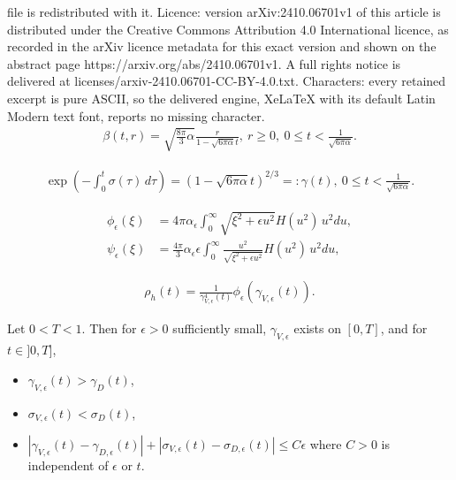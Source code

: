 \documentclass[10pt,a4paper]{amsart}
\begin{document}
file is redistributed with it. Licence: version arXiv:2410.06701v1 of this article is distributed under the Creative Commons Attribution 4.0 International licence, as recorded in the arXiv licence metadata for this exact version and shown on the abstract page https://arxiv.org/abs/2410.06701v1. A full rights notice is delivered at licenses/arxiv-2410.06701-CC-BY-4.0.txt. Characters: every retained excerpt is pure ASCII, so the delivered engine, XeLaTeX with its default Latin Modern text font, reports no missing character.
\begin{align}\label{beta_dust}
  \beta(t,r) = \sqrt{\frac{8\pi}{3} \alpha}
  \frac{r}{1-\sqrt{6\pi \alpha} t},\
  r\geq 0,\ 0\leq t < \frac{1}{\sqrt{6\pi \alpha}}.
\end{align}

\begin{align}\label{gamma_dust}
  \exp\left(-\int_0^t \sigma (\tau)\, d\tau\right)
  = (1-\sqrt{6\pi \alpha} t)^{2/3} =: \gamma(t),\
  0\leq t < \frac{1}{\sqrt{6\pi \alpha}}.
\end{align}

\begin{align}
\phi_{\epsilon}(\xi)
&=
4\pi \alpha_\epsilon \int_0^\infty \sqrt{\xi^2 + \epsilon u^2} H(u^2)\, u^2 du,
\label{phi_eps}\\
\psi_{\epsilon}(\xi)
&=
\frac{4\pi}{3} \alpha_\epsilon \epsilon
\int_0^\infty \frac{u^2}{\sqrt{\xi^2 + \epsilon u^2}} H(u^2)\, u^2 du,
\label{psi_eps}
\end{align}

\begin{align}\label{rho_h}
  \rho_h(t)=\frac{1}{\gamma^4_{V,\epsilon}(t)}\phi_\epsilon(\gamma_{V,\epsilon}(t)).
\end{align}

\begin{lemma}\label{gamma_comp}
  Let $0<T<1$. Then for $\epsilon>0$ sufficiently small,
  $\gamma_{V,\epsilon}$ exists on $[0,T]$, and for $t\in ]0,T]$,
  \begin{itemize}
    \item[(a)]
      $\gamma_{V,\epsilon}(t) > \gamma_D(t)$,
    \item[(b)]
      $\sigma_{V,\epsilon}(t) < \sigma_D(t)$,
    \item[(c)]
      $|\gamma_{V,\epsilon}(t) - \gamma_{D,\epsilon}(t)| +
      |\sigma_{V,\epsilon}(t) - \sigma_{D,\epsilon}(t)|\leq C \epsilon$
      where $C>0$ is independent of $\epsilon$ or $t$.
  \end{itemize}
\end{lemma}
\end{document}
